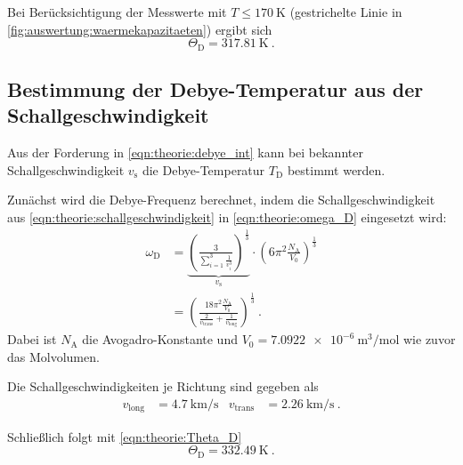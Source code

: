 Bei Berücksichtigung der Messwerte mit $T \leq \SI{170}{\kelvin}$ (gestrichelte Linie in \autoref{fig:auswertung:waermekapazitaeten})
ergibt sich
\[
    \Theta_\text{D} = \SI{317.81}{\kelvin} \ .
\]


\subsection{Bestimmung der Debye-Temperatur aus der Schallgeschwindigkeit}
\label{sec:auswertung:debye_vs}
Aus der Forderung in \autoref{eqn:theorie:debye_int}
kann bei bekannter Schallgeschwindigkeit $v_\text{s}$ die Debye-Temperatur $T_\text{D}$ bestimmt werden.

Zunächst wird die Debye-Frequenz berechnet,
indem die Schallgeschwindigkeit aus \autoref{eqn:theorie:schallgeschwindigkeit}
in \autoref{eqn:theorie:omega_D} eingesetzt wird:
\begin{align*}
    \omega_\text{D} &= \underbrace{\left( \frac{3}{\sum_{i=1}^3 \frac{1}{v^3_i}} \right)^\frac{1}{3}}_{v_\text{s}}
    \cdot \left(6 \pi^2 \frac{N_\text{A}}{V_0}\right)^{\frac{1}{3}}
    \\
    &= \left( \frac{18 \pi^2 \frac{N_\text{A}}{V_0}}{\frac{2}{v_\text{trans}} + \frac{1}{v_\text{long}}} \right)^\frac{1}{3} \ .
\end{align*}
Dabei ist $N_\text{A}$ die Avogadro-Konstante und $V_0 = \SI{7.0922e-6}{\cubic\meter\per\mol}$ \cite{periodictable} wie zuvor das Molvolumen.

Die Schallgeschwindigkeiten je Richtung sind gegeben \cite{versuchsanleitung} als
\begin{align*}
    v_\text{long} &= \SI{4.7}{\kilo\meter\per\second}
    &
    v_\text{trans} &= \SI{2.26}{\kilo\meter\per\second} \ .
\end{align*}

Schließlich folgt mit \autoref{eqn:theorie:Theta_D}
\[
    \Theta_\text{D} = \SI{332.49}{\kelvin} \ .
\]
